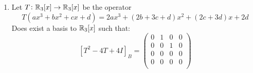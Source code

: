 \documentclass[11pt, a4paper]{article}
\begin{document}
\begin{exercise} \phantom{}
  \begin{enumerate}
    \item[(1)] Let $T\colon \mathbb{R}_3[x]\to\mathbb{R}_3[x]$ be the operator 
      \[
      T(ax^3+bx^2+cx+d) = 2ax^3+(2b+3c+d)x^2+(2c+3d)x+2d
      \]
      Does exist a basis to $\mathbb{R}_3[x]$ such that: 
      \[ 
      [T^2-4T+4I]_B = 
      \begin{pmatrix}
      0 & 1 & 0 & 0\\
      0 & 0 & 1 & 0\\
      0 & 0 & 0 & 0\\
      0 & 0 & 0 & 0\\
      \end{pmatrix} \]
  \end{enumerate}
\end{exercise}
\end{document}
